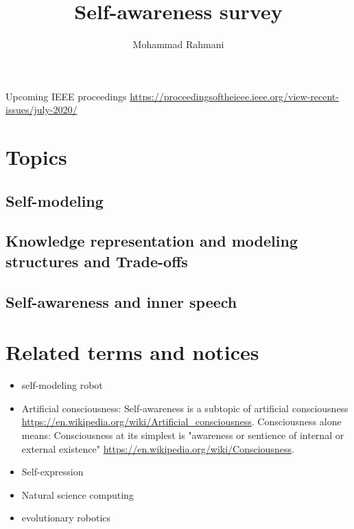 \documentclass{article}
\begin{document}
	
	\title{Self-awareness survey}
	\author{Mohammad Rahmani}
	\date{}
	\maketitle
	Upcoming IEEE proceedings
	\url{https://proceedingsoftheieee.ieee.org/view-recent-issues/july-2020/}
	\section{Topics}
		\subsection{Self-modeling}
			\citet{bellman-2017-self-modeling-and-self-awareness}
			\citet{kwiatkowski-2019-zero-shot-learning-on-simulated-robots}	
			\citet{kwiatkowski-2019-task-agnostic-self-modeling-machines}
		\subsection{Knowledge representation and modeling structures and Trade-offs}
		\cite{minku-2016-knowledge-representation-and-modelling-structures-and-trade-offs}
		\subsection{Self-awareness and inner speech}
		\cite{chella-2020-developing-self-awareness-in-robots-via-inner-speech}
	\section{Related terms and notices}
		\begin{itemize}
			\item self-modeling robot \citep{kwiatkowski-2019-task-agnostic-self-modeling-machines}
			\item Artificial consciousness: Self-awareness is a subtopic of artificial consciousness \url{https://en.wikipedia.org/wiki/Artificial_consciousness}. Consciousness alone means: Consciousness at its simplest is "awareness or sentience of internal or external existence" \url{https://en.wikipedia.org/wiki/Consciousness}.
			\item Self-expression \citep{lewis-2011-a-survey-of-self-awareness-and-its-application-in-computing-systems}
			\item Natural science computing
			\item evolutionary robotics
		\end{itemize}
	
\end{document}
